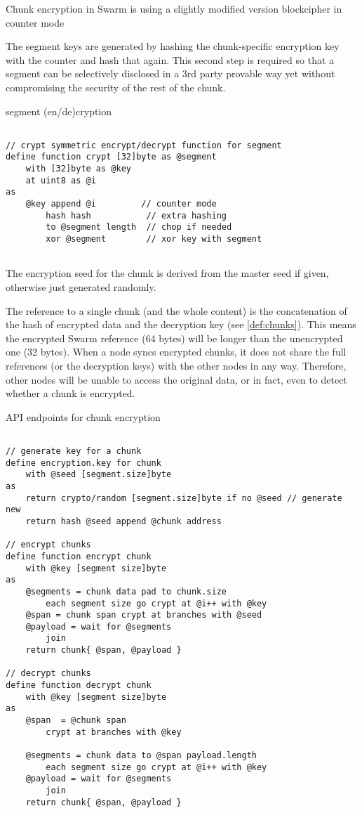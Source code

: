 
Chunk encryption in Swarm is using a slightly modified version blockcipher in counter mode

The segment keys are generated by hashing the chunk-specific encryption key with the counter and hash that again. This second step is required so that a segment can be selectively disclosed in a 3rd party provable way yet without compromising the security of the rest of the chunk.


\begin{definition}{segment (en/de)cryption}\label{def:segment=encrypt}
\begin{lstlisting}[language=buzz1]

// crypt symmetric encrypt/decrypt function for segment
define function crypt [32]byte as @segment
    with [32]byte as @key
    at uint8 as @i
as
    @key append @i         // counter mode 
        hash hash           // extra hashing
        to @segment length  // chop if needed
        xor @segment        // xor key with segment
    
\end{lstlisting}
\end{definition}    

The encryption seed for the chunk is derived from the master seed if given, otherwise just generated randomly. 

The reference to a single chunk (and the whole content) is the concatenation of the hash of encrypted data and the decryption key (see \ref{def:chunks}). This means the encrypted Swarm reference (64 bytes) will be longer than the unencrypted one (32 bytes). When a node syncs encrypted chunks, it does not share the full references (or the decryption keys) with the other nodes in any way.  Therefore, other nodes will be unable to access the original data, or in fact, even to detect whether a chunk is encrypted.

\begin{definition}{API endpoints for chunk encryption}\label{def:encrypt}
\begin{lstlisting}[language=buzz1]

// generate key for a chunk
define encryption.key for chunk
    with @seed [segment.size]byte
as
    return crypto/random [segment.size]byte if no @seed // generate new 
    return hash @seed append @chunk address

// encrypt chunks
define function encrypt chunk
    with @key [segment size]byte 
as       
    @segments = chunk data pad to chunk.size
        each segment size go crypt at @i++ with @key 
    @span = chunk span crypt at branches with @seed 
    @payload = wait for @segments 
        join
    return chunk{ @span, @payload } 

// decrypt chunks
define function decrypt chunk
    with @key [segment size]byte
as       
    @span  = @chunk span 
        crypt at branches with @key 
            
    @segments = chunk data to @span payload.length
        each segment size go crypt at @i++ with @key
    @payload = wait for @segments 
        join
    return chunk{ @span, @payload } 

\end{lstlisting}
\end{definition} 
       
